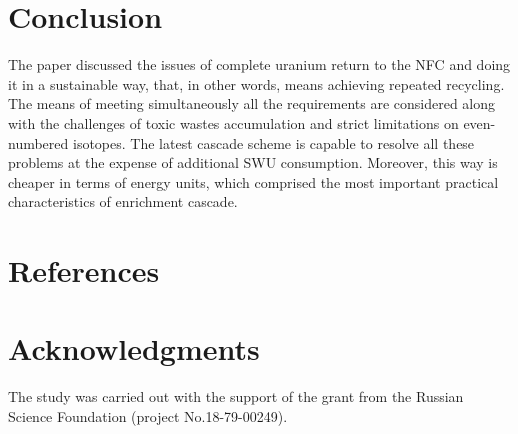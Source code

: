 \documentclass[a4paper]{jpconf}
\begin{document}
\section{Conclusion}
The paper discussed the issues of complete uranium return to the NFC and doing it in a sustainable way, that, in other words, means achieving repeated recycling. The means of meeting simultaneously all the requirements are considered along with the challenges of toxic wastes accumulation and strict limitations on even-numbered isotopes. The latest cascade scheme is capable to resolve all these problems at the expense of additional SWU consumption. Moreover, this way is cheaper in terms of energy units, which comprised the most important practical characteristics of enrichment cascade.



\section*{References}





\section*{Acknowledgments}
The study was carried out with the support of the grant from the Russian Science Foundation (project No.18-79-00249).
\end{document}
